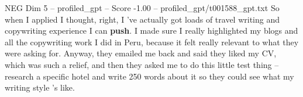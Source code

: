 \begin{textsample}{NEG Dim 5 – profiled\_gpt – Score -1.00 – profiled\_gpt/t001588\_gpt.txt}  \label{ex:f5_neg_023}
So when I applied I thought, right, I ’ve actually got loads of travel writing and copywriting experience I can \textbf{push}.
I made sure I really highlighted my blogs and all the copywriting work I did in Peru, because it felt really relevant to what they were asking for.
Anyway, they emailed me back and said they liked my CV, which was such a relief, and then they asked me to do this little test thing – research a specific hotel and write 250 words about it so they could see what my writing style ’s like.

\end{textsample}
